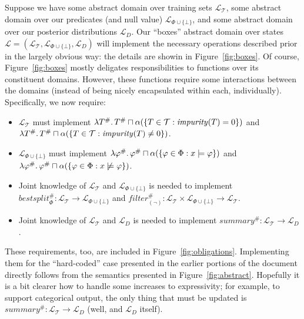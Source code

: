 Suppose we have some abstract domain over training sets $\mathcal{L}_\mathcal{T}$,
some abstract domain over our predicates (and null value) $\mathcal{L}_{\Phi \cup \{\bot\}}$,
and some abstract domain over our posterior distributions $\mathcal{L}_D$.
Our ``boxes'' abstract domain over states
$\mathcal{L} = (\mathcal{L}_\mathcal{T}, \mathcal{L}_{\Phi \cup \{\bot\}}, \mathcal{L}_D)$
will implement the necessary operations described prior in the largely obvious way:
the details are showin in Figure~\ref{fig:boxes}.
Of course, Figure~\ref{fig:boxes} mostly deligates responsibilities
to functions over its constituent domains.
However, these functions require some interactions between the domains
(instead of being nicely encapsulated within each, individually).
Specifically, we now require:
\begin{itemize}
    \item $\mathcal{L}_\mathcal{T}$ must implement
        $\lambda T^\# \ldotp T^\# \sqcap
        \alpha(\{T \in \mathcal{T} : \mathit{impurity}(T) = 0\})$
        and
        $\lambda T^\# \ldotp T^\# \sqcap
        \alpha(\{T \in \mathcal{T} : \mathit{impurity}(T) \neq 0\})$.
    \item $\mathcal{L}_{\Phi \cup \{\bot\}}$ must implement
        $\lambda \varphi^\# \ldotp \varphi^\# \sqcap
        \alpha(\{\varphi \in \Phi : x \models \varphi\})$
        and
        $\lambda \varphi^\# \ldotp \varphi^\# \sqcap
        \alpha(\{\varphi \in \Phi : x \not\models \varphi\})$.
    \item Joint knowledge of $\mathcal{L}_\mathcal{T}$ and
        $\mathcal{L}_{\Phi \cup \{\bot\}}$ is needed to implement
        $\mathit{bestsplit}^\#_\Phi : \mathcal{L}_\mathcal{T} \rightarrow
        \mathcal{L}_{\Phi \cup \{\bot\}}$ and
        $\mathit{filter}^\#_{(\lnot)} :
        \mathcal{L}_\mathcal{T} \times \mathcal{L}_{\Phi\cup\{\bot\}}
        \rightarrow \mathcal{L}_\mathcal{T}$.
    \item Joint knowledge of $\mathcal{L}_\mathcal{T}$ and $\mathcal{L}_D$
        is needed to implement
        $\mathit{summary}^\# : \mathcal{L}_\mathcal{T} \rightarrow \mathcal{L}_D$.
\end{itemize}
These requirements, too, are included in Figure~\ref{fig:obligations}.
Implementing them for the ``hard-coded'' case presented in the earlier
portions of the document directly follows from the semantics presented in Figure~\ref{fig:abstract}.
Hopefully it is a bit clearer how to handle some increases to expressivity;
for example, to support categorical output,
the only thing that must be updated is
$\mathit{summary}^\# : \mathcal{L}_\mathcal{T} \rightarrow \mathcal{L}_D$
(well, and $\mathcal{L}_D$ itself).

